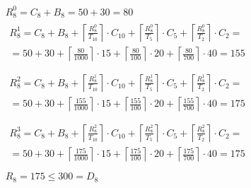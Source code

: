 \begin{gather*}
  R_8^0 = C_8 + B_8 = 50 + 30 = 80 \\
  \begin{multlined}
    R_8^1 = C_8 + B_8 + \left\lceil\frac{R_8^0}{T_{10}}\right\rceil\cdot C_{10} + %
    \left\lceil\frac{R_8^0}{T_5}\right\rceil\cdot C_5 + %
    \left\lceil\frac{R_8^0}{T_2}\right\rceil\cdot C_2 = \\%
    = 50 + 30 + \left\lceil\frac{80}{1000}\right\rceil\cdot 15 + %
    \left\lceil\frac{80}{100}\right\rceil\cdot 20 + %
    \left\lceil\frac{80}{700}\right\rceil\cdot 40 = 155 \\
  \end{multlined} \\
  \begin{multlined}
    R_8^2 = C_8 + B_8 + \left\lceil\frac{R_8^1}{T_{10}}\right\rceil\cdot C_{10} + %
    \left\lceil\frac{R_8^1}{T_5}\right\rceil\cdot C_5 + %
    \left\lceil\frac{R_8^1}{T_2}\right\rceil\cdot C_2 = \\%
    = 50 + 30 + \left\lceil\frac{155}{1000}\right\rceil\cdot 15 + %
    \left\lceil\frac{155}{100}\right\rceil\cdot 20 + %
    \left\lceil\frac{155}{700}\right\rceil\cdot 40 = 175 \\
  \end{multlined} \\
  \begin{multlined}
    R_8^3 = C_8 + B_8 + \left\lceil\frac{R_8^2}{T_{10}}\right\rceil\cdot C_{10} + %
    \left\lceil\frac{R_8^2}{T_5}\right\rceil\cdot C_5 + %
    \left\lceil\frac{R_8^2}{T_2}\right\rceil\cdot C_2 = \\%
    = 50 + 30 + \left\lceil\frac{175}{1000}\right\rceil\cdot 15 + %
    \left\lceil\frac{175}{100}\right\rceil\cdot 20 + %
    \left\lceil\frac{175}{700}\right\rceil\cdot 40 = 175 \\
  \end{multlined} \\
  R_8 = 175 \le 300 = D_8
\end{gather*}

